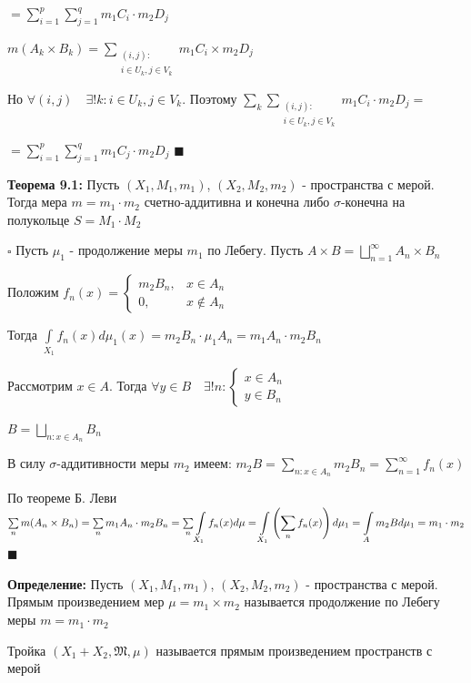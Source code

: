 \documentclass[a4paper]{report}
\newcommand*{\hm}[1]{#1\nobreak\discretionary{}%
            {\hbox{$\mathsurround=0pt #1$}}{}}
\begin{document}
\noindent$=\sum\limits_{i=1}^p\sum\limits_{j=1}^q m_1 C_i\cdot m_2 D_j$

$m(A_k\times B_k)=\sum\limits_{\substack{(i,j)\colon\\ i\in U_k, j\in V_k}}m_1 C_i\times m_2 D_j$

Но $\forall(i,j)\quad\exists!k\colon i\in U_k, j\in V_k$. Поэтому $\sum\limits_k\sum\limits_{\substack{(i,j)\colon\\ i\in U_k, j\in V_k}} m_1 C_i\cdot m_2 D_j=$

\noindent$=\sum\limits_{i=1}^p\sum\limits_{j=1}^q m_1 C_j\cdot m_2 D_j$ $\blacksquare$
\bigskip

\noindent\textbf{Теорема 9.1:} Пусть $(X_1,M_1,m_1)$, $(X_2,M_2,m_2)$ - пространства с мерой. Тогда мера $m=m_1\cdot m_2$ счетно-аддитивна и конечна либо $\sigma$-конечна на полукольце $S=M_1\cdot M_2$

\noindent $\square$ Пусть $\mu_1$ - продолжение меры $m_1$ по Лебегу. Пусть $A\times B=\bigsqcup\limits_{n=1}^\infty A_n\times B_n$

Положим $f_n(x)=\begin{cases}m_2 B_n,&x\in A_n\\0,&x\notin A_n\end{cases}$

Тогда $\displaystyle\int\limits_{X_1}f_n(x)d\mu_1(x)=m_2B_n\cdot\mu_1 A_n=m_1 A_n\cdot m_2 B_n$

Рассмотрим $x\in A$. Тогда $\forall y\in B\quad\exists! n\colon\begin{cases}x\in A_n\\y\in B_n\end{cases}$

$B=\bigsqcup\limits_{n\colon x\in A_n}B_n$

В силу $\sigma$-аддитивности меры $m_2$ имеем: $m_2 B=\sum\limits_{n\colon x\in A_n}m_2 B_n=\sum\limits_{n=1}^\infty f_n(x)$

По теореме Б. Леви $\sum\limits_n m(A_n\times B_n)=\sum\limits_n m_1 A_n\cdot m_2 B_n=\sum\limits_n\displaystyle\int\limits_{X_1}f_n(x)d\mu\hm=\displaystyle\int\limits_{X_1}\left(\sum\limits_n f_n(x)\right)d\mu_1=\displaystyle\int\limits_A m_2 Bd\mu_1=m_1\cdot m_2$ $\blacksquare$

\bigskip

\noindent\textbf{Определение:} Пусть $(X_1,M_1,m_1)$, $(X_2,M_2,m_2)$ - пространства с мерой. Прямым произведением мер $\mu=m_1\times m_2$ называется продолжение по Лебегу меры $m=m_1\cdot m_2$

Тройка $(X_1+X_2,\mathfrak M,\mu)$ называется прямым произведением пространств с мерой
\bigskip
\end{document}
